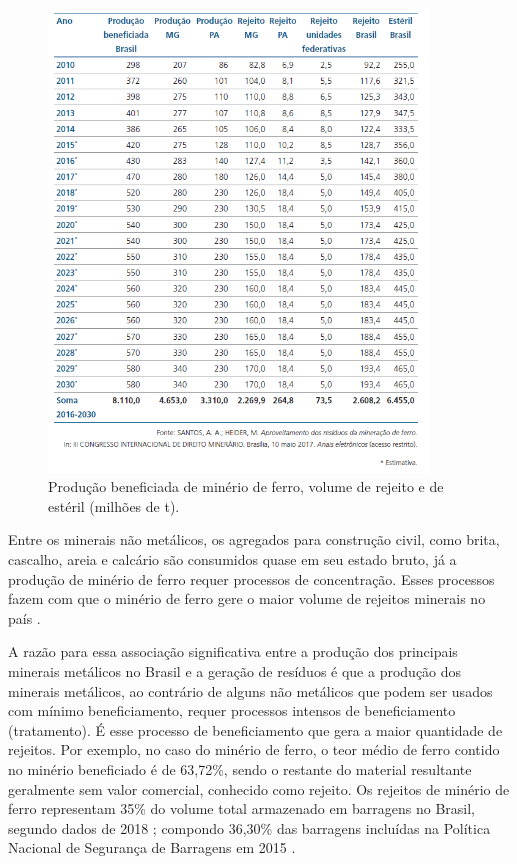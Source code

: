 \begin{figure}[!htb]
    \centering
    \includegraphics[width=0.9\textwidth]{figures/image17_producao_minerio.png}
    \caption{Produção beneficiada de minério de ferro, volume de rejeito e de estéril (milhões de t).}
    \label{fig:producao_minerio}
\end{figure}

Entre os minerais não metálicos, os agregados para construção civil, como brita, cascalho, areia e calcário são consumidos quase em seu estado bruto, já a produção de minério de ferro requer processos de concentração. Esses processos fazem com que o minério de ferro gere o maior volume de rejeitos minerais no país \cite{carvalho2018}.

A razão para essa associação significativa entre a produção dos principais minerais metálicos no Brasil e a geração de resíduos é que a produção dos minerais metálicos, ao contrário de alguns não metálicos que podem ser usados com mínimo beneficiamento, requer processos intensos de beneficiamento (tratamento). É esse processo de beneficiamento que gera a maior quantidade de rejeitos. Por exemplo, no caso do minério de ferro, o teor médio de ferro contido no minério beneficiado é de 63,72\%, sendo o restante do material resultante geralmente sem valor comercial, conhecido como rejeito. Os rejeitos de minério de ferro representam 35\% do volume total armazenado em barragens no Brasil, segundo dados de 2018 \cite{ibram2016, freire2020}; compondo 36,30\% das barragens incluídas na Política Nacional de Segurança de Barragens em 2015 \cite{carvalho2018}.

